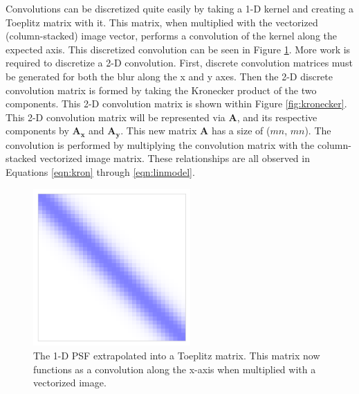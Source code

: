 \documentclass[letterpaper, 11pt, titlepage, twocolumn]{article}
\def\figurewidthalt{6cm}
\begin{document}
Convolutions can be discretized quite easily by taking a 1-D kernel and creating a Toeplitz matrix with it. This matrix, when multiplied with the vectorized (column-stacked) image vector, performs a convolution of the kernel along the expected axis. This discretized convolution can be seen in Figure \ref{fig:toeplitz}. More work is required to discretize a 2-D convolution. First, discrete convolution matrices must be generated for both the blur along the x and y axes. Then the 2-D discrete convolution matrix is formed by taking the Kronecker product of the two components. This 2-D convolution matrix is shown within Figure \ref{fig:kronecker}. This 2-D convolution matrix will be represented via \textbf{A}, and its respective components by $\mathbf{A_x}$ and $\mathbf{A_y}$. This new matrix \textbf{A} has a size of ($mn$, $mn$). The convolution is performed by multiplying the convolution matrix with the column-stacked vectorized image matrix. These relationships are all observed in Equations \eqref{eqn:kron} through \eqref{eqn:linmodel}.

\begin{figure}[H]
  \centering
  \includegraphics[width=\figurewidthalt]{toeplitz.png}
  \caption{The 1-D PSF extrapolated into a Toeplitz matrix. This matrix now functions as a convolution along the x-axis when multiplied with a vectorized image.}
  \label{fig:toeplitz}
\end{figure}
\end{document}
